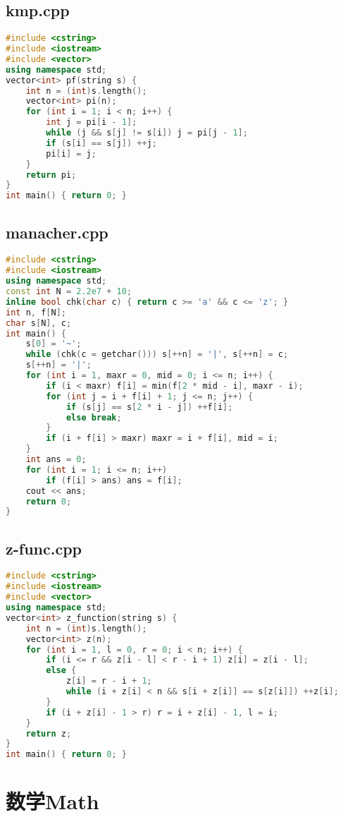 \documentclass[9pt, a4paper, oneside]{book}
\begin{document}
\section{kmp.cpp}
\begin{lstlisting}[language={C++}]
#include <cstring>
#include <iostream>
#include <vector>
using namespace std;
vector<int> pf(string s) {
    int n = (int)s.length();
    vector<int> pi(n);
    for (int i = 1; i < n; i++) {
        int j = pi[i - 1];
        while (j && s[j] != s[i]) j = pi[j - 1];
        if (s[i] == s[j]) ++j;
        pi[i] = j;
    }
    return pi;
}
int main() { return 0; }\end{lstlisting}
\section{manacher.cpp}
\begin{lstlisting}[language={C++}]
#include <cstring>
#include <iostream>
using namespace std;
const int N = 2.2e7 + 10;
inline bool chk(char c) { return c >= 'a' && c <= 'z'; }
int n, f[N];
char s[N], c;
int main() {
    s[0] = '~';
    while (chk(c = getchar())) s[++n] = '|', s[++n] = c;
    s[++n] = '|';
    for (int i = 1, maxr = 0, mid = 0; i <= n; i++) {
        if (i < maxr) f[i] = min(f[2 * mid - i], maxr - i);
        for (int j = i + f[i] + 1; j <= n; j++) {
            if (s[j] == s[2 * i - j]) ++f[i];
            else break;
        }
        if (i + f[i] > maxr) maxr = i + f[i], mid = i;
    }
    int ans = 0;
    for (int i = 1; i <= n; i++)
        if (f[i] > ans) ans = f[i];
    cout << ans;
    return 0;
}\end{lstlisting}
\section{z-func.cpp}
\begin{lstlisting}[language={C++}]
#include <cstring>
#include <iostream>
#include <vector>
using namespace std;
vector<int> z_function(string s) {
    int n = (int)s.length();
    vector<int> z(n);
    for (int i = 1, l = 0, r = 0; i < n; i++) {
        if (i <= r && z[i - l] < r - i + 1) z[i] = z[i - l];
        else {
            z[i] = r - i + 1;
            while (i + z[i] < n && s[i + z[i]] == s[z[i]]) ++z[i];
        }
        if (i + z[i] - 1 > r) r = i + z[i] - 1, l = i;
    }
    return z;
}
int main() { return 0; }\end{lstlisting}
\chapter{数学Math}
\end{document}
